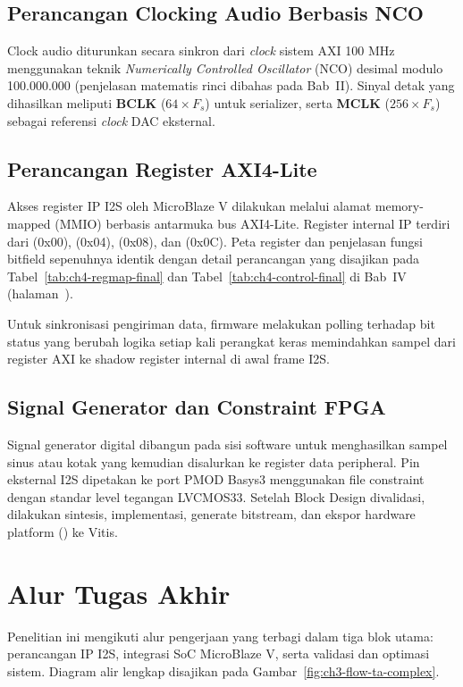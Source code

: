 \subsection{Perancangan Clocking Audio Berbasis NCO}
Clock audio diturunkan secara sinkron dari \textit{clock} sistem AXI 100 MHz menggunakan teknik \textit{Numerically Controlled Oscillator} (NCO) desimal modulo 100.000.000 (penjelasan matematis rinci dibahas pada Bab~II). Sinyal detak yang dihasilkan meliputi \textbf{BCLK} ($64 \times F_s$) untuk serializer, serta \textbf{MCLK} ($256 \times F_s$) sebagai referensi \textit{clock} DAC eksternal.

\subsection{Perancangan Register AXI4-Lite}
Akses register IP I2S oleh MicroBlaze V dilakukan melalui alamat memory-mapped (MMIO) berbasis antarmuka bus AXI4-Lite. Register internal IP terdiri dari  (0x00),  (0x04),  (0x08), dan  (0x0C). Peta register dan penjelasan fungsi bitfield sepenuhnya identik dengan detail perancangan yang disajikan pada Tabel~\ref{tab:ch4-regmap-final} dan Tabel~\ref{tab:ch4-control-final} di Bab~IV (halaman~\pageref{tab:ch4-regmap-final}).

Untuk sinkronisasi pengiriman data, firmware melakukan polling terhadap bit status  yang berubah logika setiap kali perangkat keras memindahkan sampel dari register AXI ke shadow register internal di awal frame I2S.

\subsection{Signal Generator dan Constraint FPGA}
Signal generator digital dibangun pada sisi software untuk menghasilkan sampel sinus atau kotak yang kemudian disalurkan ke register data peripheral. Pin eksternal I2S dipetakan ke port PMOD Basys3 menggunakan file constraint  dengan standar level tegangan LVCMOS33. Setelah Block Design divalidasi, dilakukan sintesis, implementasi, generate bitstream, dan ekspor hardware platform () ke Vitis.

\section{Alur Tugas Akhir}

Penelitian ini mengikuti alur pengerjaan yang terbagi dalam tiga blok utama: perancangan IP I2S, integrasi SoC MicroBlaze V, serta validasi dan optimasi sistem. Diagram alir lengkap disajikan pada Gambar~\ref{fig:ch3-flow-ta-complex}.

